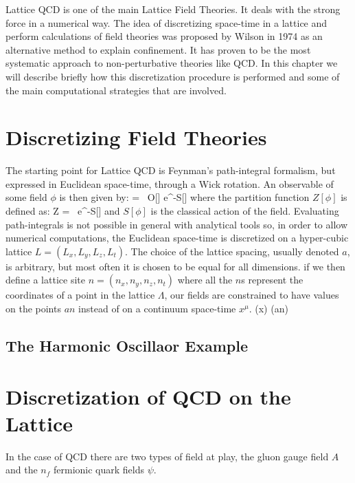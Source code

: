 
Lattice QCD is one of the main Lattice Field Theories. It deals with the strong force in a numerical way. The idea of discretizing space-time in a lattice and perform calculations of field theories was proposed by Wilson in 1974 \cite{wilson_confinement_1974} as an alternative method to explain confinement. It has proven to be the most systematic approach to non-perturbative theories like QCD. In this chapter we will describe briefly how this discretization procedure is performed and some of the main computational strategies that are involved.

\section{Discretizing Field Theories}








The starting point for Lattice QCD is Feynman's path-integral formalism, but expressed in Euclidean space-time, through a Wick rotation. An observable of some field $\phi$ is then given by:
\beq
	 =  \int \D[\phi] ~O[\phi] e^{-S[\phi]}
\eeq
where the partition function $Z[\phi]$ is defined as:
\beq
	Z = \int \D[\phi] ~e^{-S[\phi]} 
\eeq
and $S[\phi]$ is the classical action of the field. Evaluating path-integrals is not possible in general with analytical tools so, in order to allow numerical computations, the Euclidean space-time is discretized on a hyper-cubic lattice $L = (L_x, L_y, L_z, L_t)$. The choice of the lattice spacing, usually denoted $a$, is arbitrary, but most often it is chosen to be equal for all dimensions. if we then define a lattice site $n = (n_x, n_y, n_z, n_t)$ where all the $n$s represent the coordinates of a point in the lattice $\Lambda$, our fields are constrained to have values on the points $an$ instead of on a continuum space-time $x^\mu$.
\beq
    \phi(x)  \phi(an)
\eeq
\subsection{The Harmonic Oscillaor Example}

\section{Discretization of QCD on the Lattice}
In the case of QCD there are two types of field at play, the gluon gauge field $A$ and the $n_f$ fermionic quark fields $\psi$. 

